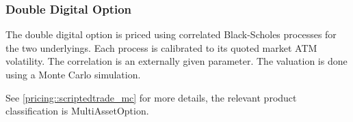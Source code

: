 \subsubsection{Double Digital Option}
\label{pricing::doubledigitaloption}

The double digital option is priced using correlated Black-Scholes processes for the two underlyings. Each process is
calibrated to its quoted market ATM volatility. The correlation is an externally given parameter. The valuation is done
using a Monte Carlo simulation.

See \ref{pricing::scriptedtrade_mc} for more details, the relevant product classification is MultiAssetOption.

